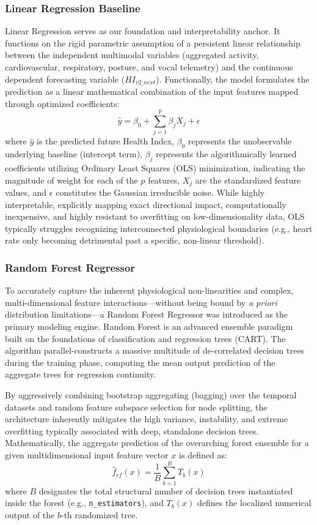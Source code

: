 \documentclass[11pt,a4paper]{article}
\begin{document}
\subsubsection{Linear Regression Baseline}
Linear Regression serves as our foundation and interpretability anchor. It functions on the rigid parametric assumption of a persistent linear relationship between the independent multimodal variables (aggregated activity, cardiovascular, respiratory, posture, and vocal telemetry) and the continuous dependent forecasting variable ($HI_{v2\_next}$). Functionally, the model formulates the prediction as a linear mathematical combination of the input features mapped through optimized coefficients:
\begin{equation}
    \hat{y} = \beta_0 + \sum_{j=1}^{p} \beta_j X_j + \epsilon
\end{equation}
where $\hat{y}$ is the predicted future Health Index, $\beta_0$ represents the unobservable underlying baseline (intercept term), $\beta_j$ represents the algorithmically learned coefficients utilizing Ordinary Least Squares (OLS) minimization, indicating the magnitude of weight for each of the $p$ features, $X_j$ are the standardized feature values, and $\epsilon$ constitutes the Gaussian irreducible noise. While highly interpretable, explicitly mapping exact directional impact, computationally inexpensive, and highly resistant to overfitting on low-dimensionality data, OLS typically struggles recognizing interconnected physiological boundaries (e.g., heart rate only becoming detrimental past a specific, non-linear threshold).

\subsubsection{Random Forest Regressor}
To accurately capture the inherent physiological non-linearities and complex, multi-dimensional feature interactions—without being bound by \textit{a priori} distribution limitations—a Random Forest Regressor was introduced as the primary modeling engine. Random Forest is an advanced ensemble paradigm built on the foundations of classification and regression trees (CART). The algorithm parallel-constructs a massive multitude of de-correlated decision trees during the training phase, computing the mean output prediction of the aggregate trees for regression continuity.

By aggressively combining bootstrap aggregating (bagging) over the temporal datasets and random feature subspace selection for node splitting, the architecture inherently mitigates the high variance, instability, and extreme overfitting typically associated with deep, standalone decision trees. Mathematically, the aggregate prediction of the overarching forest ensemble for a given multidimensional input feature vector $x$ is defined as:
\begin{equation}
    \hat{f}_{rf}(x) = \frac{1}{B} \sum_{b=1}^{B} T_b(x)
\end{equation}
where $B$ designates the total structural number of decision trees instantiated inside the forest (e.g., \texttt{n\_estimators}), and $T_b(x)$ defines the localized numerical output of the $b$-th randomized tree.
\end{document}
